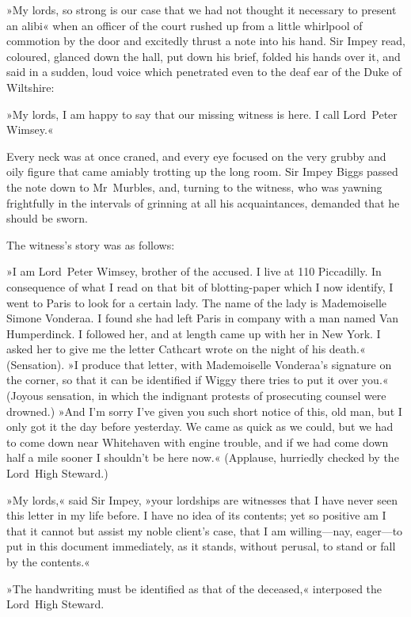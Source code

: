 »My lords, so strong is our case that we had not thought it necessary
to present an alibi\longdash« when an officer of the court rushed up from a
little whirlpool of commotion by the door and excitedly thrust a note
into his hand. Sir Impey read, coloured, glanced down the hall, put down
his brief, folded his hands over it, and said in a sudden, loud voice
which penetrated even to the deaf ear of the Duke of Wiltshire:

»My lords, I am happy to say that our missing witness is here. I call
Lord~Peter Wimsey.«

Every neck was at once craned, and every eye focused on the very grubby
and oily figure that came amiably trotting up the long room. Sir Impey
Biggs passed the note down to Mr~Murbles, and, turning to the witness,
who was yawning frightfully in the intervals of grinning at all his
acquaintances, demanded that he should be sworn.

The witness's story was as follows:

»I am Lord~Peter Wimsey, brother of the accused. I live at 110
Piccadilly. In consequence of what I read on that bit of blotting-paper
which I now identify, I went to Paris to look for a certain lady. The
name of the lady is Mademoiselle Simone Vonderaa. I found she had
left Paris in company with a man named Van Humperdinck. I followed
her, and at length came up with her in New York. I asked her to give
me the letter Cathcart wrote on the night of his death.« (Sensation).
»I produce that letter, with Mademoiselle Vonderaa's signature on
the corner, so that it can be identified if Wiggy there tries to put
it over you.« (Joyous sensation, in which the indignant protests of
prosecuting counsel were drowned.) »And I'm sorry I've given you
such short notice of this, old man, but I only got it the day before
yesterday. We came as quick as we could, but we had to come down near
Whitehaven with engine trouble, and if we had come down half a mile
sooner I shouldn't be here now.« (Applause, hurriedly checked by the
Lord~High Steward.)

»My lords,« said Sir Impey, »your lordships are witnesses that I
have never seen this letter in my life before. I have no idea of its
contents; yet so positive am I that it cannot but assist my noble
client's case, that I am willing—nay, eager—to put in this document
immediately, as it stands, without perusal, to stand or fall by the
contents.«

»The handwriting must be identified as that of the deceased,«
interposed the Lord~High Steward.

